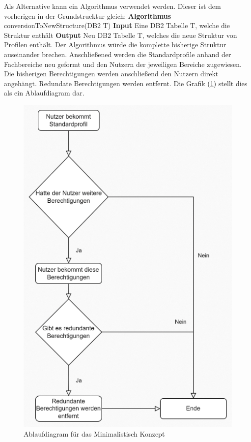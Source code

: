 Als Alternative kann ein Algorithmus verwendet werden.
Dieser ist dem vorherigen in der Grundstrucktur gleich:
\newline
\newline
\textbf{Algorithmus} conversionToNewStructure(DB$2$ T)
\newline
\newline
\textbf{Input} Eine DB2 Tabelle T, welche die Struktur enthält
\newline
\newline
\textbf{Output} Neu DB2 Tabelle T, welches die neue Struktur von Profilen enthält.
\newline
\newline
Der Algorithmus würde die komplette bisherige Struktur auseinander brechen.
Anschließened werden die Standardprofile anhand der Fachbereiche neu geformt und den Nutzern der jeweiligen Bereiche zugewiesen.
Die bisherigen Berechtigungen werden anschließend den Nutzern direkt angehängt.
Redundate Berechtigungen werden entfernt.
Die Grafik (\ref{fig:Mini}) stellt dies als ein Ablaufdiagram dar.
\begin{figure}[h!]
 \centering
 \includegraphics[width=1\textwidth]{gfx/Picture/Mini.PNG}
 \caption{Ablaufdiagram für das Minimalistisch Konzept}
 \label{fig:Mini}
\end{figure}
